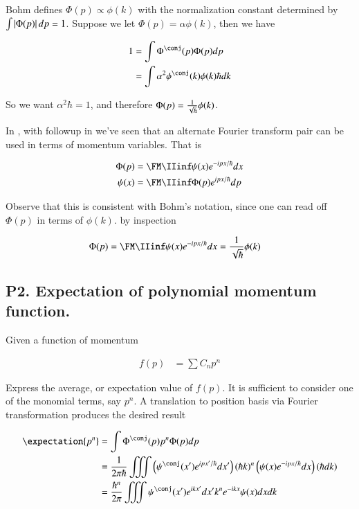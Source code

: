 Bohm defines $\Phi(p) \propto \phi(k)$ with the normalization constant determined by $\int \left\lvert{\Phi(p)}\right\rvert dp = 1$.  Suppose we 
let $\Phi(p) = \alpha \phi(k)$, then we have

\begin{align*}
1 
&= \int \Phi^\conj(p) \Phi(p) dp \\
&= \int \alpha^2 \phi^\conj(k) \phi(k) \hbar d k
\end{align*}

So we want $\alpha^2 \hbar = 1$, and therefore $\Phi(p) = \frac{1}{\sqrt{\hbar}} \phi(k)$.

In \cite{mcmahon2005qmd}, with followup in \cite{PJqmFourier} we've seen that an alternate Fourier transform pair can be used in terms of
momentum variables.  That is

\begin{align*}
\Phi(p) &= \FM \IIinf \psi(x) e^{-ipx/\hbar} dx \\
\psi(x) &= \FM \IIinf \Phi(p) e^{ipx/\hbar} dp \\
\end{align*}

Observe that this is consistent with Bohm's notation, since one can read off 
$\Phi(p)$ in terms of $\phi(k)$.
by inspection

\begin{align*}
\Phi(p) &= \FM \IIinf \psi(x) e^{-ipx/\hbar} dx = \inv{\sqrt{\hbar}} \phi(k)
\end{align*}

\subsection{P2. Expectation of polynomial momentum function. }

Given a function of momentum 

\begin{align*}
f(p) &= \sum C_n p^n
\end{align*}

Express the average, or expectation value of $f(p)$.  It is sufficient to consider one of the monomial terms, say $p^n$.  A translation 
to position basis via Fourier transformation produces the desired result

\begin{align*}
\expectation{p^n} 
&= \int \Phi^\conj(p) p^n \Phi(p) dp \\
&= \inv{2\pi \hbar} \iiint \left( \psi^\conj(x') e^{ipx'/\hbar} dx' \right) (\hbar k)^n \left( \psi(x) e^{-ipx/\hbar} dx \right) (\hbar dk) \\
&= \frac{\hbar^n}{2\pi } \iiint \psi^\conj(x') e^{ikx'} dx' k^n e^{-i k x} \psi(x) dx dk \\
\end{align*}


